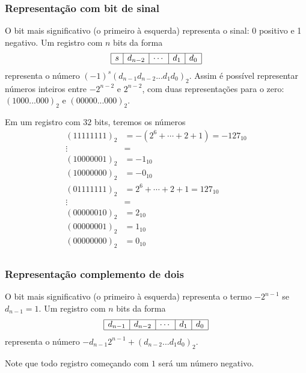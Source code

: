 \subsubsection{Representação com bit de sinal}
O bit mais significativo (o primeiro à esquerda) representa o sinal: 0 positivo e 1 negativo. Um registro com $n$ bits da forma
$$
\begin{array}{|c|c|c|c|c|} \hline
s&d_{n-2}&\cdots&d_1&d_0\\\hline
\end{array}
$$
representa o número $(-1)^s(d_{n-1}d_{n-2}...d_1d_0)_2$. Assim é possível representar números inteiros entre $-2^{n-2}$ e $2^{n-2}$, com duas representações para o zero: $(1000...000)_2$ e $(00000...000)_2$.
\begin{ex}
Em um registro com $32$ bits, teremos os números
$$
\begin{array}{cl}
 (11111111)_2 &= -(2^{6}+\cdots+2+1)=-127_{10}\\
     \vdots    &=  \\
 (10000001)_2 &= -1_{10} \\
 (10000000)_2 &= -0_{10} \\
 (01111111)_2 &= 2^6+\cdots+2+1=127_{10} \\
     \vdots    &=  \\
 (00000010)_2 &= 2_{10} \\
 (00000001)_2 &= 1_{10} \\
 (00000000)_2 &= 0_{10} \\
\end{array}
$$
\end{ex}


\subsubsection{Representação complemento de dois}
O bit mais significativo (o primeiro à esquerda) representa o termo $-2^{n-1}$ se $d_{n-1}=1$.  Um registro com $n$ bits da forma
$$
\begin{array}{|c|c|c|c|c|} \hline
d_{n-1}&d_{n-2}&\cdots&d_1&d_0\\\hline
\end{array}
$$
representa o número $-d_{n-1}2^{n-1}+(d_{n-2}...d_1d_0)_2$. 

Note que todo registro começando com $1$ será um número negativo.


